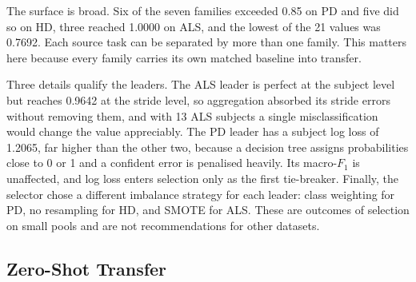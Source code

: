 \documentclass[conference]{IEEEtran}
\begin{document}
The surface is broad. Six of the seven families exceeded 0.85 on PD and five did so on HD, three reached 1.0000 on ALS, and the lowest of the 21 values was 0.7692. Each source task can be separated by more than one family. This matters here because every family carries its own matched baseline into transfer.

Three details qualify the leaders. The ALS leader is perfect at the subject level but reaches 0.9642 at the stride level, so aggregation absorbed its stride errors without removing them, and with 13 ALS subjects a single misclassification would change the value appreciably. The PD leader has a subject log loss of 1.2065, far higher than the other two, because a decision tree assigns probabilities close to 0 or 1 and a confident error is penalised heavily. Its macro-$F_1$ is unaffected, and log loss enters selection only as the first tie-breaker. Finally, the selector chose a different imbalance strategy for each leader: class weighting for PD, no resampling for HD, and SMOTE for ALS. These are outcomes of selection on small pools and are not recommendations for other datasets.

\subsection{Zero-Shot Transfer}
\label{sec:res-transfer}
\end{document}

